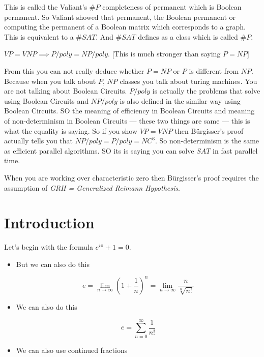 \documentclass{report}
\begin{document}
{This is called the Valiant’s $\# P$ completeness of permanent which is Boolean permanent. So Valiant showed that permanent, the Boolean permanent or computing the permanent of a Boolean matrix which corresponds to a graph. This is equivalent to a $\# SAT$. And $\# SAT$ defines as a class which is called $\# P$.
\begin{Theorem}{\cite{burgissercompred}}{}
	$VP=VNP\implies P/poly=NP/poly$. [This is much stronger than saying $P=NP$]
\end{Theorem}
From this you can not really deduce whether $P=NP$ or $P$ is different from $NP$. Because when you talk about $P$, $NP$ classes you talk about turing machines. You are not talking about Boolean Circuits. $P/poly$ is actually the problems that solve using Boolean Circuits and $NP/poly$ is also defined in the similar way using Boolean Circuits. SO the meaning of efficiency in Boolean Circuits and meaning of non-determinism in Boolean Circuits --- these two things are same ---  this is what the equality is saying.
So if you show $VP=VNP$ then B\"{u}rgisser's proof actually tells you that $NP/poly=P/poly=NC^3$. So non-determinism is the same as efficient parallel algorithms. SO its is saying you can solve $SAT$ in fast parallel time.

When you are working over characteristic zero then B\"{u}rgisser's proof requires the assumption of \textit{GRH = Generalized Reimann Hypothesis}.


\section*{Introduction}

Let's begin with the formula $e^{i\pi}+1=0$. 
\begin{itemize}

\item But we can also do this 

$$e=\lim_{n\to\infty} \left(1+\frac{1}{n}\right)^n = \lim_{n\to\infty}\frac{n}{\sqrt[n]{n!}}$$

\item We can also do this

$$e=\sum_{n=0}^{\infty} \frac{1}{n!}$$

\item We can also use continued fractions


\end{itemize}}
\end{document}
